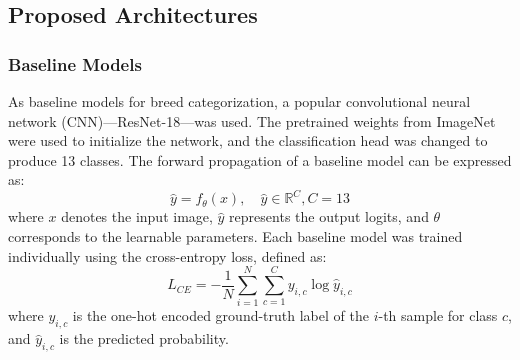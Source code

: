 \documentclass[conference]{IEEEtran}
\begin{document}
\begin{table}[htbp]
\caption{Dataset and Architecture Parameter Settings}
\begin{center}
\label{tab1}
\end{center}
\end{table}

\subsection{Proposed Architectures}

\subsubsection{Baseline Models} 
As baseline models for breed categorization, a popular convolutional neural network (CNN)---ResNet-18---was used. The pretrained weights from ImageNet were used to initialize the network, and the classification head was changed to produce 13 classes.
The forward propagation of a baseline model can be expressed as:
\begin{equation}
\hat{y} = f_\theta(x), \quad \hat{y} \in \mathbb{R}^C, C = 13 \label{eq1}
\end{equation}
where $x$ denotes the input image, $\hat{y}$ represents the output logits, and $\theta$ corresponds to the learnable parameters. Each baseline model was trained individually using the cross-entropy loss, defined as:
\begin{equation}
L_{CE} = - \frac{1}{N} \sum_{i=1}^N \sum_{c=1}^C y_{i,c} \log \hat{y}_{i,c} \label{eq2}
\end{equation}
where $y_{i,c}$ is the one-hot encoded ground-truth label of the $i$-th sample for class $c$, and $\hat{y}_{i,c}$ is the predicted probability.
\end{document}
